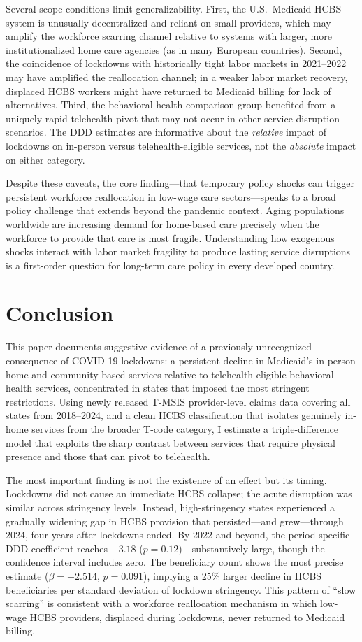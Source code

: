 \documentclass[12pt]{article}
\begin{document}
Several scope conditions limit generalizability. First, the U.S.\ Medicaid HCBS system is unusually decentralized and reliant on small providers, which may amplify the workforce scarring channel relative to systems with larger, more institutionalized home care agencies (as in many European countries). Second, the coincidence of lockdowns with historically tight labor markets in 2021--2022 may have amplified the reallocation channel; in a weaker labor market recovery, displaced HCBS workers might have returned to Medicaid billing for lack of alternatives. Third, the behavioral health comparison group benefited from a uniquely rapid telehealth pivot that may not occur in other service disruption scenarios. The DDD estimates are informative about the \textit{relative} impact of lockdowns on in-person versus telehealth-eligible services, not the \textit{absolute} impact on either category.

Despite these caveats, the core finding---that temporary policy shocks can trigger persistent workforce reallocation in low-wage care sectors---speaks to a broad policy challenge that extends beyond the pandemic context. Aging populations worldwide are increasing demand for home-based care precisely when the workforce to provide that care is most fragile. Understanding how exogenous shocks interact with labor market fragility to produce lasting service disruptions is a first-order question for long-term care policy in every developed country.


\section{Conclusion}

This paper documents suggestive evidence of a previously unrecognized consequence of COVID-19 lockdowns: a persistent decline in Medicaid's in-person home and community-based services relative to telehealth-eligible behavioral health services, concentrated in states that imposed the most stringent restrictions. Using newly released T-MSIS provider-level claims data covering all states from 2018--2024, and a clean HCBS classification that isolates genuinely in-home services from the broader T-code category, I estimate a triple-difference model that exploits the sharp contrast between services that require physical presence and those that can pivot to telehealth.

The most important finding is not the existence of an effect but its timing. Lockdowns did not cause an immediate HCBS collapse; the acute disruption was similar across stringency levels. Instead, high-stringency states experienced a gradually widening gap in HCBS provision that persisted---and grew---through 2024, four years after lockdowns ended. By 2022 and beyond, the period-specific DDD coefficient reaches $-3.18$ ($p = 0.12$)---substantively large, though the confidence interval includes zero. The beneficiary count shows the most precise estimate ($\beta = -2.514$, $p = 0.091$), implying a 25\% larger decline in HCBS beneficiaries per standard deviation of lockdown stringency. This pattern of ``slow scarring'' is consistent with a workforce reallocation mechanism in which low-wage HCBS providers, displaced during lockdowns, never returned to Medicaid billing.
\end{document}
